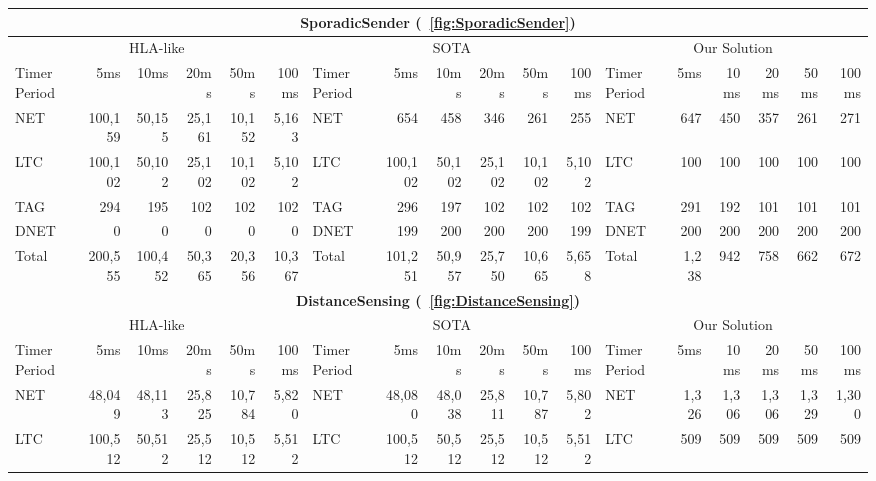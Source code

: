 \begin{table*}
\scriptsize
	\centering
	\begin{tabular}{|l|rrrrr||l|rrrrr||l|rrrrr|}
		\hline
		\multicolumn{18}{|c|}{\textbf{SporadicSender (\figurename~\ref{fig:SporadicSender})}} \\
		\hline
		\multicolumn{6}{|c||}{HLA-like} & \multicolumn{6}{|c||}{SOTA} & \multicolumn{6}{|c|}{Our Solution} \\
		\hline
		Timer Period \hspace{-5pt} & 5ms & 10ms & 20ms & 50ms & 100ms & Timer Period \hspace{-5pt} & 5ms & 10ms & 20ms & 50ms & 100ms & Timer Period \hspace{-5pt} & 5ms & 10ms & 20ms & 50ms & 100ms \\
		\hline
		NET & 100,159 & 50,155 & 25,161 & 10,152 & 5,163 & NET & 654 & 458 & 346 & 261 & 255 & NET & 647 & 450 & 357 & 261 & 271 \\
		LTC & 100,102 & 50,102 & 25,102 & 10,102 & 5,102 & LTC & 100,102 & 50,102 & 25,102 & 10,102 & 5,102 & LTC & 100 & 100 & 100 & 100 & 100 \\
		TAG & 294 & 195 & 102 & 102 & 102 & TAG & 296 & 197 & 102 & 102 & 102 & TAG & 291 & 192 & 101 & 101 & 101 \\
		DNET & 0 & 0 & 0 & 0 & 0 & DNET & 199 & 200 & 200 & 200 & 199 & DNET & 200 & 200 & 200 & 200 & 200 \\
		\hline
		Total & 200,555 & 100,452 & 50,365 & 20,356 & 10,367 & Total & 101,251 & 50,957 & 25,750 & 10,665 & 5,658 & Total & 1,238 & 942 & 758 & 662 & 672 \\
		\hline
%
		\hline
		\multicolumn{18}{|c|}{\textbf{DistanceSensing (\figurename~\ref{fig:DistanceSensing})}} \\
		\hline
		\multicolumn{6}{|c||}{HLA-like} & \multicolumn{6}{|c||}{SOTA} & \multicolumn{6}{|c|}{Our Solution} \\
		\hline
		Timer Period \hspace{-5pt} & 5ms & 10ms & 20ms & 50ms & 100ms & Timer Period \hspace{-5pt} & 5ms & 10ms & 20ms & 50ms & 100ms & Timer Period \hspace{-5pt} & 5ms & 10ms & 20ms & 50ms & 100ms \\
		\hline
		NET & 48,049 & 48,113 & 25,825 & 10,784 & 5,820 & NET & 48,080 & 48,038 & 25,811 & 10,787 & 5,802 & NET & 1,326 & 1,306 & 1,306 & 1,329 & 1,300 \\
		LTC & 100,512 & 50,512 & 25,512 & 10,512 & 5,512 & LTC & 100,512 & 50,512 & 25,512 & 10,512 & 5,512 & LTC & 509 & 509 & 509 & 509 & 509 \\

\end{tabular}
\end{table*}

